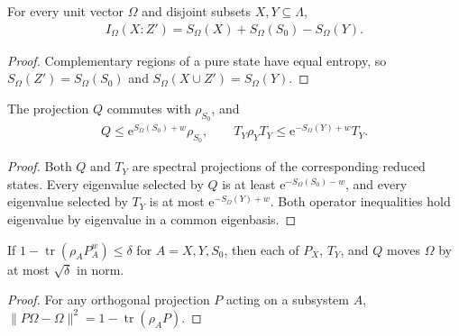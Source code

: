 \begin{lemma}
    \label{thm:al_amp_restoring_purity}
    \leanok
    For every unit vector $\Omega$ and disjoint subsets $X,Y\subseteq\Lambda$,
    \begin{align*}
        I_\Omega(X:Z')=S_\Omega(X)+S_\Omega(S_0)-S_\Omega(Y).
    \end{align*}
\end{lemma}
\begin{proof}\leanok
    Complementary regions of a pure state have equal entropy, so
    $S_\Omega(Z')=S_\Omega(S_0)$ and $S_\Omega(X\cup Z')=S_\Omega(Y)$.
\end{proof}

\begin{lemma}
    \label{thm:al_amp_restoring_spectral}
    \leanok
    The projection $Q$ commutes with $\rho_{S_0}$, and
    \begin{align*}
        Q\le\mathrm e^{S_\Omega(S_0)+w}\rho_{S_0},\qquad
        T_Y\rho_YT_Y\le\mathrm e^{-S_\Omega(Y)+w}T_Y.
    \end{align*}
\end{lemma}
\begin{proof}\leanok
    Both $Q$ and $T_Y$ are spectral projections of the corresponding reduced
    states. Every eigenvalue selected by $Q$ is at least
    $\mathrm e^{-S_\Omega(S_0)-w}$, and every eigenvalue selected by $T_Y$ is
    at most $\mathrm e^{-S_\Omega(Y)+w}$. Both operator inequalities hold
    eigenvalue by eigenvalue in a common eigenbasis.
\end{proof}

\begin{lemma}
    \label{thm:al_amp_restoring_failure}
    \leanok
    If $1-\operatorname{tr}(\rho_AP_A^w)\le\delta$ for $A=X,Y,S_0$, then each
    of $P_X$, $T_Y$, and $Q$ moves $\Omega$ by at most $\sqrt\delta$ in norm.
\end{lemma}
\begin{proof}\leanok
    For any orthogonal projection $P$ acting on a subsystem $A$,
    $\|P\Omega-\Omega\|^2=1-\operatorname{tr}(\rho_AP)$.
\end{proof}


